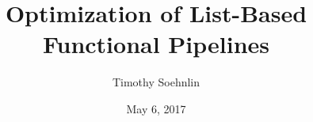 \documentclass[12pt]{report}
\title{Optimization of List-Based Functional Pipelines}
\author{Timothy Soehnlin}
\date{May 6, 2017}         %
\begin{document}

\begingroup
  \raggedright
  \sloppy
  \printbibliography
\endgroup
\end{document}
